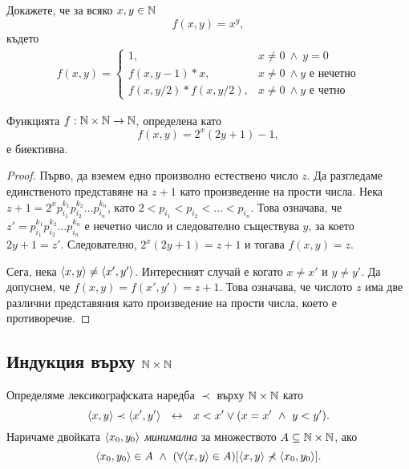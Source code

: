 \begin{problem}
  Докажете, че за всяко $x,y\in\mathbb{N}$
  \[f(x,y) = x^y,\]
  където
  \begin{align*}
    f(x,y) = 
    \begin{cases}
      1, & x\neq 0\ \wedge\ y = 0\\
      f(x,y-1) * x, & x\neq 0\ \wedge y\mbox{ е нечетно}\\
      f(x,y/2) * f(x,y/2), & x\neq 0\ \wedge y\mbox{ е четно}
    \end{cases}
  \end{align*}
\end{problem}


\begin{problem}
  Функцията $f:\mathbb{N}\times\mathbb{N} \to \mathbb{N}$, определена като 
  \[f(x,y) = 2^x(2y+1)-1,\]
  е биективна.
\end{problem}
\begin{proof}
  Първо, да вземем едно произволно естествено число $z$.
  Да разгледаме единственото представяне на $z+1$ като произведение на прости числа.
  Нека $z+1 = 2^{x}p^{k_1}_{i_1}p^{k_2}_{i_2}\dots p^{k_n}_{i_n}$, като $2 < p_{i_1} < p_{i_2} < \dots < p_{i_n}$.
  Това означава, че $z' = p^{k_1}_{i_1}p^{k_2}_{i_2}\dots p^{k_n}_{i_n}$ е нечетно число и следователно съществува $y$,
  за което $2y+1 = z'$.
  Следователно, $2^x(2y+1) = z+1$ и тогава $f(x,y) = z$.

  Сега, нека $\langle{x,y}\rangle \neq \langle{x',y'}\rangle$.
  Интересният случай е когато $x \neq x'$ и $y \neq y'$.
  Да допуснем, че $f(x,y) = f(x',y') = z+1$.
  Това означава, че числото $z$ има две различни представяния като произведение на прости числа,
  което е противоречие.
\end{proof}



\subsection*{Индукция върху $\mathbb{N}\times\mathbb{N}$}

\begin{dfn}
  Определяме лексикографската наредба $\prec$ върху $\mathbb{N}\times\mathbb{N}$ като
  \[\pair{x,y} \prec \pair{x^\prime,y^\prime}\ \iff\ x < x^\prime \vee (x = x^\prime\ \wedge\ y < y^\prime).\]
  Наричаме двойката $\langle{x_0,y_0}\rangle$ {\em минимална} за множеството $A \subseteq \mathbb{N}\times\mathbb{N}$, ако
  \[\langle{x_0,y_0}\rangle\in A\ \wedge\ (\forall \langle{x,y}\rangle\in A)[\langle{x,y}\rangle\not\prec\langle{x_0,y_0}\rangle].\]
\end{dfn}

